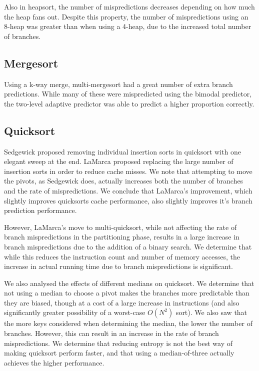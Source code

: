 Also in heapsort, the number of mispredictions decreases depending on how much
the heap fans out. Despite this property, the number of mispredictions using an
8-heap was greater than when using a 4-heap, due to the increased total number
of branches.


\subsection{Mergesort}

Using a k-way merge, multi-mergesort had a great number of extra branch
predictions. While many of these were mispredicted using the bimodal predictor,
the two-level adaptive predictor was able to predict a higher proportion
correctly.


\subsection{Quicksort}

Sedgewick proposed removing individual insertion sorts in quicksort with one
elegant sweep at the end. LaMarca proposed replacing the large number of
insertion sorts in order to reduce cache misses. We note that attempting to move
the pivots, as Sedgewick does, actually increases both the number of branches
and the rate of mispredictions. We conclude that LaMarca's improvement, which
slightly improves quicksorts cache performance, also slightly improves it's
branch prediction performance.

However, LaMarca's move to multi-quicksort, while not affecting the rate of
branch mispredictions in the partitioning phase, results in a large increase in
branch mispredictions due to the addition of a binary search. We determine that
while this reduces the instruction count and number of memory accesses, the
increase in actual running time due to branch mispredictions is significant.

We also analysed the effects of different medians on quicksort. We determine that
not using a median to choose a pivot makes the branches more predictable than
they are biased, though at a cost of a large increase in instructions (and also
significantly greater possibility of a worst-case $O(N^2)$ sort). We also saw
that the more keys considered when determining the median, the lower the number
of branches. However, this can result in an increase in the rate of branch
mispredictions. We determine that reducing entropy is not the best way of making
quicksort perform faster, and that using a median-of-three actually achieves the
higher performance.


